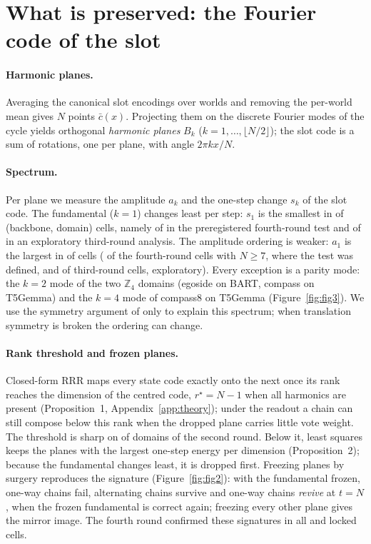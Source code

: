 \section{What is preserved: the Fourier code of the slot}\label{sec:fourier}
\paragraph{Harmonic planes.}
Averaging the canonical slot encodings over worlds and removing the per-world mean gives $N$ points $\bar c(x)$. Projecting them on the
discrete Fourier modes of the cycle yields orthogonal \emph{harmonic planes} $B_k$ ($k=1,\dots,\lfloor N/2\rfloor$); the slot code is a
sum of rotations, one per plane, with angle $2\pi k x/N$.

\paragraph{Spectrum.}
Per plane we measure the amplitude $a_k$ and the one-step change $s_k$ of the slot code. The fundamental ($k=1$) changes least per
step: $s_1$ is the smallest in \CLsevenSoneSmallestAll{} of \CLsevenCellsAll{} (backbone, domain) cells, namely
\CLsevenSoneSmallest{} of \CLsevenCells{} in the preregistered fourth-round test and \CLsevenSoneSmallestVthree{} of
\CLsevenCellsVthree{} in an exploratory third-round analysis. The amplitude ordering is weaker: $a_1$ is the largest in
\CLsevenAoneLargestAll{} of \CLsevenACellsAll{} cells (\CLsevenAoneLargest{} of the \CLsevenAoneEvaluable{} fourth-round cells with
$N \ge 7$, where the test was defined, and \CLsevenAoneLargestVthree{} of \CLsevenACellsVthree{} third-round cells, exploratory). Every
exception is a parity mode: the $k=2$ mode of the two $\mathbb{Z}_4$ domains (egoside on BART, compass on T5Gemma) and the $k=4$ mode of
compass8 on T5Gemma (Figure~\ref{fig:fig3}). We use the symmetry argument of \citet{karkada2026symmetries} only to explain this spectrum; when
translation symmetry is broken the ordering can change.

\paragraph{Rank threshold and frozen planes.}
Closed-form RRR maps every state code exactly onto the next once its rank reaches the dimension of the centred code, $r^\star = N-1$
when all harmonics are present (Proposition~1, Appendix~\ref{app:theory}); under the readout a chain can still compose below this
rank when the dropped plane carries little vote weight. The threshold is sharp on \CLfiveRstarSharp{} of \CLfiveRstarDomains{} domains of the second round.
Below it, least squares keeps the planes with the largest one-step energy per dimension (Proposition~2); because the fundamental changes
least, it is dropped first. Freezing
planes by surgery reproduces the signature (Figure~\ref{fig:fig2}): with the fundamental frozen, one-way chains fail, alternating chains
survive and one-way chains \emph{revive} at $t=N$, when the frozen fundamental is correct again; freezing every other plane gives the
mirror image. The fourth round confirmed these signatures in all \CLfiveVoneN{} and \CLfiveVtwoaN{} locked cells.

